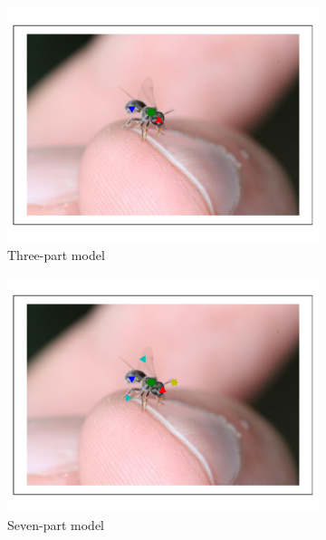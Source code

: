\documentclass[11pt, oneside]{report}
\begin{document}
        \begin{figure}[p]
            \centering
            \begin{subfigure}[b]{0.45\textwidth}
                \centering
                \includegraphics[width=\textwidth]{hog4_2.pdf}
                \caption{Three-part model}
            \end{subfigure}
            \begin{subfigure}[b]{0.45\textwidth}
                \centering
                \includegraphics[width=\textwidth]{7p_2.pdf}
                \caption{Seven-part model}
            \end{subfigure}
            \begin{subfigure}[b]{0.45\textwidth}

\end{subfigure}
\end{figure}
\end{document}
